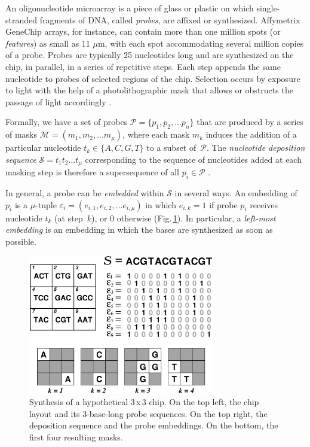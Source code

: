 \documentclass[runningheads]{llncs}
\begin{document}
An oligonucleotide microarray is a piece of glass or plastic on which
single-stranded fragments of DNA, called \emph{probes}, are affixed or
synthesized. Affymetrix GeneChip\raisebox{.6ex}{\scriptsize \textregistered}
arrays, for instance, can contain
more than one million spots (or \emph{features}) as small as 11 $\mu$m,
with each spot accommodating several million copies of a probe. Probes
are typically 25 nucleotides long and are synthesized on the chip, in parallel,
in a series of repetitive steps. Each step appends the same
nucleotide to probes of selected regions of the chip. Selection occurs
by exposure to light with the help of a photolithographic mask that
allows or obstructs the passage of light accordingly \cite{FODOR91}.

Formally, we have a set of probes $\mathcal{P} = \{p_{1}, p_{2}, ... p_{n}\}$
that are produced by a series of masks $\mathcal{M} = (m_{1}, m_{2}, ... m_{\mu})$,
where each mask $m_{k}$ induces the addition of a particular nucleotide
$t_{k} \in \{A, C, G, T\}$ to a subset of~$\mathcal{P}$. The \emph{nucleotide
deposition sequence} $\mathcal{S} = t_{1} t_{2} \ldots t_{\mu}$ corresponding
to the sequence of nucleotides added at each masking step is therefore a
supersequence of all $p_{i} \in \mathcal{P}$ \cite{RAHMANN03}.

In general, a probe can be \emph{embedded} within $\mathcal{S}$ in several
ways. An embedding of $p_{i}$ is a $\mu$-tuple
$\varepsilon_{i} = (e_{i,1}, e_{i,2}, ... e_{i,\mu})$ in which $e_{i,k} = 1$
if probe $p_{i}$ receives nucleotide $t_{k}$ (at step~$k$), or 0 otherwise
(Fig.\,\ref{fig:masking_process}). In particular, a \emph{left-most embedding}
is an embedding in which the bases are synthesized as soon as possible.

\begin{figure}
\centerline{\includegraphics[width=230pt]{chip}}
\caption{Synthesis of a hypothetical 3\,x\,3 chip. On the top left, the chip
layout and its 3-base-long probe sequences. On the top right, the deposition
sequence and the probe embeddings. On the bottom, the first four resulting masks.}
\label{fig:masking_process}
\end{figure}
\end{document}
